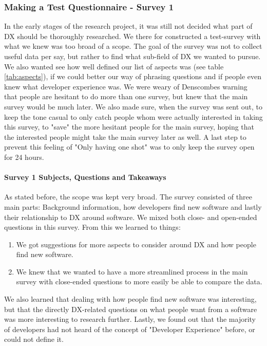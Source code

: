 \documentclass{article}
\begin{document}
\subsubsection{Making a Test Questionnaire - Survey 1}
In the early stages of the research project, it was still not decided what part of DX should be thoroughly researched.
We there for constructed a test-survey with what we knew was too broad of a scope. The goal of the survey was not to collect
useful data per say, but rather to find what sub-field of DX we wanted to pursue. We also wanted see how well defined our list of aspects was (see table \ref{tab:aspects}), if we could better our way of phrasing questions and if people even knew what developer experience was. We were weary of Denscombes warning that people are hesitant to do more than one survey, but knew that the main survey would be much later. We also made sure, when the survey was sent out, to keep the tone casual to only catch people whom were actually interested in taking this survey, to "save" the more hesitant people for the main survey, hoping that the interested people might take the main survey later as well. A last step to prevent this feeling of "Only having one shot" was to only keep the survey open for 24 hours.

\paragraph{Survey 1 Subjects, Questions and Takeaways}
As stated before, the scope was kept very broad. The survey consisted of three main parts: Background information, how developers find new software and lastly their relationship to DX around software. We mixed both close- and open-ended questions in this survey. From this we learned to things:
\begin{enumerate}
\item We got suggestions for more aspects to consider around DX and how people find new software.
\item We knew that we wanted to have a more streamlined process in the main survey with close-ended questions to more easily be able to compare the data.
\end{enumerate}

We also learned that dealing with how people find new software was interesting, but that the directly DX-related questions on what people want from a software was more interesting to research further. Lastly, we found out that the majority of developers had not heard of the concept of "Developer Experience" before, or could not define it.
\end{document}
